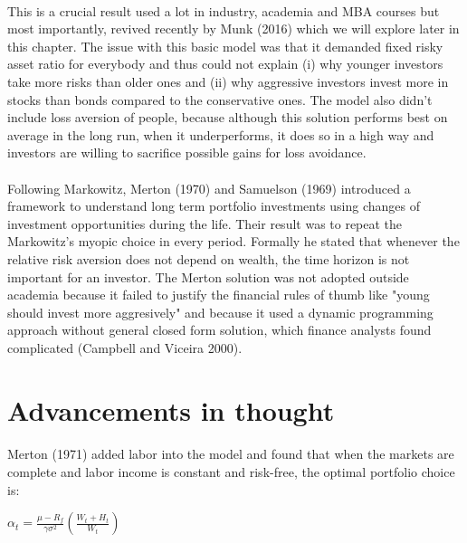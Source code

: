 \paragraph{}This is a crucial result used a lot in industry, academia and MBA courses but most importantly, revived recently by Munk (2016) which we will explore later in this chapter. The issue with this basic model was that it demanded fixed risky asset ratio for everybody and thus could not explain (i) why younger investors take more risks than older ones and (ii) why aggressive investors invest more in stocks than bonds compared to the conservative ones. The model also didn't include loss aversion of people, because although this solution performs best on average in the long run, when it underperforms, it does so in a high way and investors are willing to sacrifice possible gains for loss avoidance.

\paragraph{}Following Markowitz, Merton (1970) and Samuelson (1969) introduced a framework to understand long term portfolio investments using changes of investment opportunities during the life. Their result was to repeat the Markowitz's myopic choice in every period. Formally he stated that whenever the relative risk aversion does not depend on wealth, the time horizon is not important for an investor. The Merton solution was not adopted outside academia because it failed to justify the financial rules of thumb like "young should invest more aggresively" and because it used a dynamic programming approach without general closed form solution, which finance analysts found complicated (Campbell and Viceira 2000).



\section{Advancements in thought}

\paragraph*{}Merton (1971) added labor into the model and found that when the markets are complete and labor income is constant and risk-free, the optimal portfolio choice is:

\begin{center}
	$\alpha_t = \frac{\mu - R_f}{\gamma \sigma^2}(\frac{W_t + H_t}{W_t})$
\end{center}

